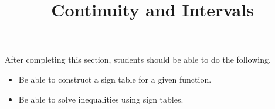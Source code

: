 \documentclass{ximera}
\title{Continuity and Intervals}
\begin{document}
\begin{abstract}
\end{abstract}

\maketitle

\begin{sectionOutcomes}
After completing this section, students should be able to do the following.

\begin{itemize}
\item Be able to construct a sign table for a given function.
\item Be able to solve inequalities using sign tables.
\end{itemize}
\end{sectionOutcomes}
\end{document}
